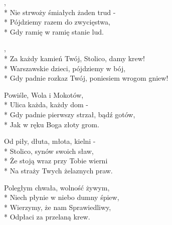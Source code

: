
\begin{lyrics}[longestline={Gdy padnie rozkaz Twój, poniesiem wrogom gniew!}]

,\\*
Nie strwoży śmiałych żaden trud -\\*
Pójdziemy razem do zwycięstwa,\\*
Gdy ramię w ramię stanie lud.

\begin{chorus}
,\\*
Za każdy kamień Twój, Stolico, damy krew!\\*
Warszawskie dzieci, pójdziemy w bój,\\*
Gdy padnie rozkaz Twój, poniesiem wrogom gniew!
\end{chorus}

Powiśle, Wola i Mokotów,\\*
Ulica każda, każdy dom -\\*
Gdy padnie pierwszy strzał, bądź gotów,\\*
Jak w ręku Boga złoty grom.

\chorusref

Od piły, dłuta, młota, kielni -\\*
Stolico, synów swoich sław,\\*
Że stoją wraz przy Tobie wierni\\*
Na straży Twych żelaznych praw.

\chorusref

Poległym chwała, wolność żywym,\\*
Niech płynie w niebo dumny śpiew,\\*
Wierzymy, że nam Sprawiedliwy,\\*
Odpłaci za przelaną krew.

\chorusref
\end{lyrics}




